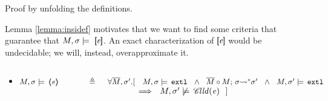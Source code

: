 \documentclass[acmsmall,review,anonymous,screen]{acmart}\settopmatter{printfolios=true,printacmref=false}
\begin{document}
Proof by unfolding the definitions. 
 
 \vspace{.3cm}
 Lemma \ref{lemma:insidef} motivates that we want to find some criteria that guarantee that $M, \sigma \models \  [\!\![ \mathit{e} ]\!\!]$.
 An exact characterization of $ [\!\![ \mathit{e} ]\!\!]$ would be undecidable; we will, instead, overapproximate it.
 
\begin{definition}
$~ \ $

\begin{itemize}

\item
$M, \sigma \models \,  \inside{\re}  \ \   \ \ \   \ \ \  \ \ \ \triangleq \ \ \   \ \forall \Mtwo, \sigma'. [
\ \ \ M, \sigma \models \,  \extThis \ \ \wedge\ \  \leadstoBoundedStar  {\Mtwo\circ M} {\sigma} {\sigma'}\ \ \wedge\ \ M, \sigma' \models \,  \extThis$\\
$\strut \hspace{4.6cm} \ \  \Longrightarrow\ \ M, \sigma' \not \models \,   \callsOn {\re}\ \ ] $

\end{itemize}


\end{definition}
 
\end{document}
